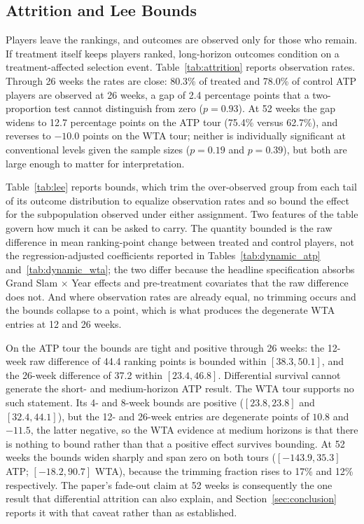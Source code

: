 \subsection{Attrition and Lee Bounds}
\label{sec:robustness_attrition}

Players leave the rankings, and outcomes are observed only for those who remain. If treatment itself keeps players ranked, long-horizon outcomes condition on a treatment-affected selection event. Table~\ref{tab:attrition} reports observation rates. Through 26 weeks the rates are close: 80.3\% of treated and 78.0\% of control ATP players are observed at 26 weeks, a gap of 2.4 percentage points that a two-proportion test cannot distinguish from zero ($p = 0.93$). At 52 weeks the gap widens to 12.7 percentage points on the ATP tour (75.4\% versus 62.7\%), and reverses to $-10.0$ points on the WTA tour; neither is individually significant at conventional levels given the sample sizes ($p = 0.19$ and $p = 0.39$), but both are large enough to matter for interpretation.

Table~\ref{tab:lee} reports \citet{Lee2009_bounds} bounds, which trim the over-observed group from each tail of its outcome distribution to equalize observation rates and so bound the effect for the subpopulation observed under either assignment. Two features of the table govern how much it can be asked to carry. The quantity bounded is the raw difference in mean ranking-point change between treated and control players, not the regression-adjusted coefficients reported in Tables~\ref{tab:dynamic_atp} and~\ref{tab:dynamic_wta}; the two differ because the headline specification absorbs Grand Slam $\times$ Year effects and pre-treatment covariates that the raw difference does not. And where observation rates are already equal, no trimming occurs and the bounds collapse to a point, which is what produces the degenerate WTA entries at 12 and 26 weeks.

On the ATP tour the bounds are tight and positive through 26 weeks: the 12-week raw difference of 44.4 ranking points is bounded within $[38.3, 50.1]$, and the 26-week difference of 37.2 within $[23.4, 46.8]$. Differential survival cannot generate the short- and medium-horizon ATP result. The WTA tour supports no such statement. Its 4- and 8-week bounds are positive ($[23.8, 23.8]$ and $[32.4, 44.1]$), but the 12- and 26-week entries are degenerate points of $10.8$ and $-11.5$, the latter negative, so the WTA evidence at medium horizons is that there is nothing to bound rather than that a positive effect survives bounding. At 52 weeks the bounds widen sharply and span zero on both tours ($[-143.9, 35.3]$ ATP; $[-18.2, 90.7]$ WTA), because the trimming fraction rises to 17\% and 12\% respectively. The paper's fade-out claim at 52 weeks is consequently the one result that differential attrition can also explain, and Section~\ref{sec:conclusion} reports it with that caveat rather than as established.

